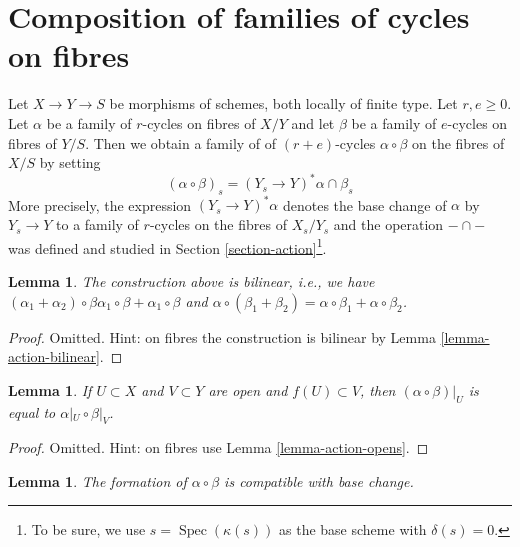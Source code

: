 \documentclass{stacks-project}
\theoremstyle{plain}
\newtheorem{lemma}[subsection]{Lemma}
\theoremstyle{definition}
\theoremstyle{remark}
\numberwithin{equation}{subsection}
\def\Spec{\mathop{\mathrm{Spec}}}
\begin{document}
\section{Composition of families of cycles on fibres}
\label{section-compose-families}

\noindent
Let $X \to Y \to S$ be morphisms of schemes, both locally of finite type.
Let $r, e \geq 0$. Let $\alpha$ be a family of $r$-cycles
on fibres of $X/Y$ and let $\beta$ be a family of $e$-cycles on
fibres of $Y/S$. Then we obtain a family of 
of $(r + e)$-cycles $\alpha \circ \beta$ on the fibres of $X/S$
by setting
$$
(\alpha \circ \beta)_s = (Y_s \to Y)^*\alpha \cap \beta_s
$$
More precisely, the expression $(Y_s \to Y)^*\alpha$ denotes
the base change of $\alpha$ by $Y_s \to Y$ to a family of $r$-cycles
on the fibres of $X_s/Y_s$ and the operation $- \cap -$
was defined and studied in Section \ref{section-action}\footnote{To be sure,
we use $s = \Spec(\kappa(s))$ as the base scheme with $\delta(s) = 0$.}.

\begin{lemma}
\label{lemma-construction-bilinear}
The construction above is bilinear, i.e., we have
$(\alpha_1 + \alpha_2) \circ \beta \alpha_1 \circ \beta +
\alpha_1 \circ \beta$ and $\alpha \circ (\beta_1 + \beta_2) =
\alpha \circ \beta_1 + \alpha \circ \beta_2$.
\end{lemma}

\begin{proof}
Omitted. Hint: on fibres the construction is bilinear
by Lemma \ref{lemma-action-bilinear}.
\end{proof}

\begin{lemma}
\label{lemma-construction-opens}
If $U \subset X$ and $V \subset Y$ are open and $f(U) \subset V$, then
$(\alpha \circ \beta)|_U$ is equal to $\alpha|_U \circ \beta|_V$.
\end{lemma}

\begin{proof}
Omitted. Hint: on fibres use
Lemma \ref{lemma-action-opens}.
\end{proof}

\begin{lemma}
\label{lemma-construction-base-change}
The formation of $\alpha \circ \beta$ is compatible with base change.
\end{lemma}
\end{document}
